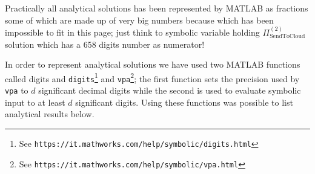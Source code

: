 \documentclass[10pt,a4paper]{article}
\begin{document}
Practically all analytical solutions has been represented by MATLAB as fractions some of which are made up of very big numbers because which has been impossible to fit in this page; just think to symbolic variable holding $\Pi_{\text{SendToCloud}}^{(2)}$ solution which has a 658 digits number as numerator! 

In order to represent analytical solutions we have used two MATLAB functions called digits and \texttt{digits}\footnote{See \texttt{https://it.mathworks.com/help/symbolic/digits.html}} and \texttt{vpa}\footnote{See \texttt{https://it.mathworks.com/help/symbolic/vpa.html}}; the first function sets the precision used by \texttt{vpa} to $d$ significant decimal digits while the second is used to evaluate symbolic input to at least $d$ significant digits. Using these functions was possible to list analytical results below.



\newpage
\end{document}
